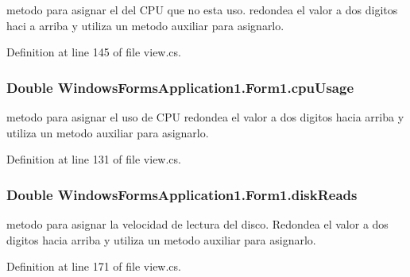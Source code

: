 metodo para asignar el del C\+P\+U que no esta uso. redondea el valor a dos digitos haci a arriba y utiliza un metodo auxiliar para asignarlo. 



Definition at line 145 of file view.\+cs.

\hypertarget{class_windows_forms_application1_1_1_form1_ae445eb3f9ea10205e542590e77476e47}{}
\subsubsection[{cpu\+Usage}]{\setlength{\rightskip}{0pt plus 5cm}Double Windows\+Forms\+Application1.\+Form1.\+cpu\+Usage\hspace{0.3cm}{\ttfamily [set]}}\label{class_windows_forms_application1_1_1_form1_ae445eb3f9ea10205e542590e77476e47}


metodo para asignar el uso de C\+P\+U redondea el valor a dos digitos hacia arriba y utiliza un metodo auxiliar para asignarlo. 



Definition at line 131 of file view.\+cs.

\hypertarget{class_windows_forms_application1_1_1_form1_a99946d55dca3d347b344e9810b15a6d2}{}
\subsubsection[{disk\+Reads}]{\setlength{\rightskip}{0pt plus 5cm}Double Windows\+Forms\+Application1.\+Form1.\+disk\+Reads\hspace{0.3cm}{\ttfamily [set]}}\label{class_windows_forms_application1_1_1_form1_a99946d55dca3d347b344e9810b15a6d2}


metodo para asignar la velocidad de lectura del disco. Redondea el valor a dos digitos hacia arriba y utiliza un metodo auxiliar para asignarlo. 



Definition at line 171 of file view.\+cs.

\hypertarget{class_windows_forms_application1_1_1_form1_a21165d5313e265bc99107b4bcb60cdad}{}
